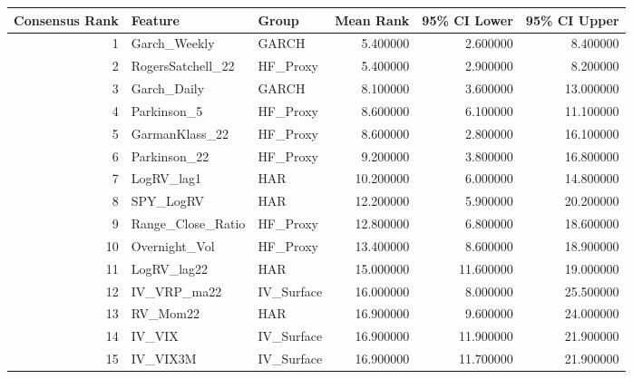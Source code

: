 \begin{tabular}{rllrrr}
\toprule
Consensus Rank & Feature & Group & Mean Rank & 95\% CI Lower & 95\% CI Upper \\
\midrule
1 & Garch\_Weekly & GARCH & 5.400000 & 2.600000 & 8.400000 \\
2 & RogersSatchell\_22 & HF\_Proxy & 5.400000 & 2.900000 & 8.200000 \\
3 & Garch\_Daily & GARCH & 8.100000 & 3.600000 & 13.000000 \\
4 & Parkinson\_5 & HF\_Proxy & 8.600000 & 6.100000 & 11.100000 \\
5 & GarmanKlass\_22 & HF\_Proxy & 8.600000 & 2.800000 & 16.100000 \\
6 & Parkinson\_22 & HF\_Proxy & 9.200000 & 3.800000 & 16.800000 \\
7 & LogRV\_lag1 & HAR & 10.200000 & 6.000000 & 14.800000 \\
8 & SPY\_LogRV & HAR & 12.200000 & 5.900000 & 20.200000 \\
9 & Range\_Close\_Ratio & HF\_Proxy & 12.800000 & 6.800000 & 18.600000 \\
10 & Overnight\_Vol & HF\_Proxy & 13.400000 & 8.600000 & 18.900000 \\
11 & LogRV\_lag22 & HAR & 15.000000 & 11.600000 & 19.000000 \\
12 & IV\_VRP\_ma22 & IV\_Surface & 16.000000 & 8.000000 & 25.500000 \\
13 & RV\_Mom22 & HAR & 16.900000 & 9.600000 & 24.000000 \\
14 & IV\_VIX & IV\_Surface & 16.900000 & 11.900000 & 21.900000 \\
15 & IV\_VIX3M & IV\_Surface & 16.900000 & 11.700000 & 21.900000 \\
\bottomrule
\end{tabular}
